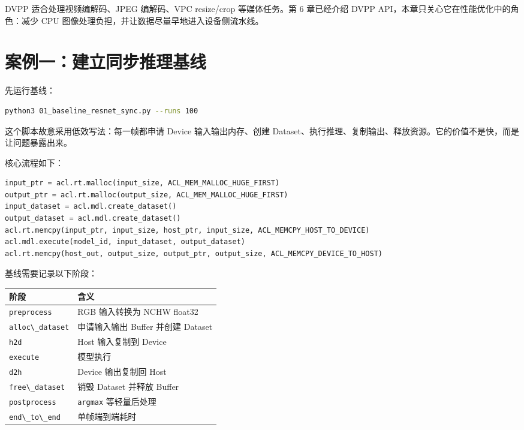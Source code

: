 DVPP 适合处理视频编解码、JPEG 编解码、VPC resize/crop 等媒体任务。第 6
章已经介绍 DVPP API，本章只关心它在性能优化中的角色：减少 CPU
图像处理负担，并让数据尽量早地进入设备侧流水线。

\section{案例一：建立同步推理基线}\label{src-book-chapter8-h9}

先运行基线：

\begin{lstlisting}[language=bash]
python3 01_baseline_resnet_sync.py --runs 100
\end{lstlisting}

这个脚本故意采用低效写法：每一帧都申请 Device 输入输出内存、创建
Dataset、执行推理、复制输出、释放资源。它的价值不是快，而是让问题暴露出来。

核心流程如下：

\begin{lstlisting}[language=Python]
input_ptr = acl.rt.malloc(input_size, ACL_MEM_MALLOC_HUGE_FIRST)
output_ptr = acl.rt.malloc(output_size, ACL_MEM_MALLOC_HUGE_FIRST)
input_dataset = acl.mdl.create_dataset()
output_dataset = acl.mdl.create_dataset()
acl.rt.memcpy(input_ptr, input_size, host_ptr, input_size, ACL_MEMCPY_HOST_TO_DEVICE)
acl.mdl.execute(model_id, input_dataset, output_dataset)
acl.rt.memcpy(host_out, output_size, output_ptr, output_size, ACL_MEMCPY_DEVICE_TO_HOST)
\end{lstlisting}

基线需要记录以下阶段：

\begin{longtable}[]{@{}ll@{}}
\toprule\noalign{}
阶段 & 含义 \\
\midrule\noalign{}
\endhead
\bottomrule\noalign{}
\endlastfoot
\passthrough{\lstinline!preprocess!} & RGB 输入转换为 NCHW float32 \\
\passthrough{\lstinline!alloc\_dataset!} & 申请输入输出 Buffer 并创建
Dataset \\
\passthrough{\lstinline!h2d!} & Host 输入复制到 Device \\
\passthrough{\lstinline!execute!} & 模型执行 \\
\passthrough{\lstinline!d2h!} & Device 输出复制回 Host \\
\passthrough{\lstinline!free\_dataset!} & 销毁 Dataset 并释放 Buffer \\
\passthrough{\lstinline!postprocess!} & \passthrough{\lstinline!argmax!}
等轻量后处理 \\
\passthrough{\lstinline!end\_to\_end!} & 单帧端到端耗时 \\
\end{longtable}

